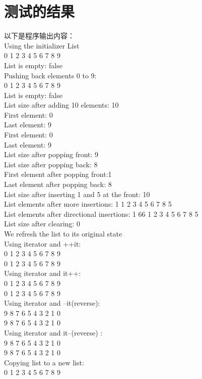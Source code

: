 \documentclass[UTF8]{ctexart}
\begin{document}
\section{测试的结果}
以下是程序输出内容：\\
Using the initializer List\\
0 1 2 3 4 5 6 7 8 9 \\
List is empty: false\\
Pushing back elements 0 to 9:\\
0 1 2 3 4 5 6 7 8 9 \\
List is empty: false\\
List size after adding 10 elements: 10\\
First element: 0\\
Last element: 9\\
First element: 0\\
Last element: 9\\
List size after popping front: 9\\
List size after popping back: 8\\
First element after popping front:1\\
Last element after popping back: 8\\
List size after inserting 1 and 5 at the front: 10\\
List elements after more insertions: 1 1 2 3 4 5 6 7 8 5 \\
List elements after directional insertions: 1 66 1 2 3 4 5 6 7 8 5 \\
List size after clearing: 0\\
We refresh the list to its original state\\
Using iterator and ++it:\\
0 1 2 3 4 5 6 7 8 9\\
0 1 2 3 4 5 6 7 8 9 \\
Using iterator and it++:\\
0 1 2 3 4 5 6 7 8 9 \\
0 1 2 3 4 5 6 7 8 9 \\
Using iterator and --it(reverse):\\
9 8 7 6 5 4 3 2 1 0\\
9 8 7 6 5 4 3 2 1 0\\
Using iterator and it--(reverse) :\\
9 8 7 6 5 4 3 2 1 0\\
9 8 7 6 5 4 3 2 1 0\\
Copying list to a new list:\\
0 1 2 3 4 5 6 7 8 9 \\
\end{document}
